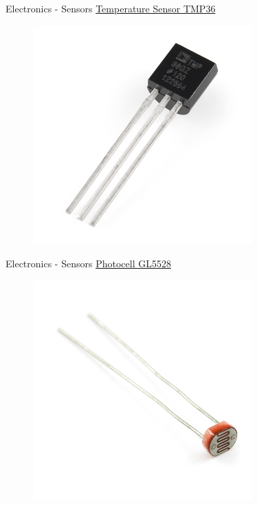 \documentclass{beamer}
\begin{document}
\begin{frame}{Electronics - Sensors}
    \href{https://www.sparkfun.com/products/10988}{Temperature Sensor TMP36}
    \begin{figure}[h]
        \includegraphics[width=0.75\textwidth]{temperature.jpg}
    \end{figure}
\end{frame}

\begin{frame}{Electronics - Sensors}
    \href{https://www.sparkfun.com/products/9088}{Photocell GL5528}
    \begin{figure}[h]
        \includegraphics[width=0.75\textwidth]{photocell.jpg}
    \end{figure}
\end{frame}
\end{document}
